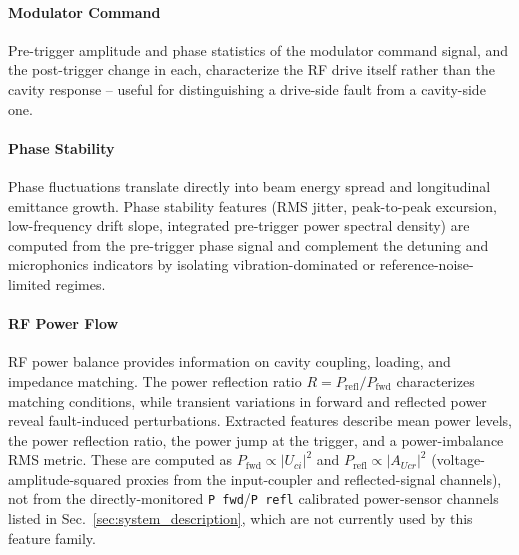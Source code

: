 \paragraph{Modulator Command}

Pre-trigger amplitude and phase statistics of the modulator command signal, and the post-trigger change in each, characterize the RF drive itself rather than the cavity response -- useful for distinguishing a drive-side fault from a cavity-side one.

\paragraph{Phase Stability}

Phase fluctuations translate directly into beam energy spread and longitudinal emittance growth. Phase stability features (RMS jitter, peak-to-peak excursion, low-frequency drift slope, integrated pre-trigger power spectral density) are computed from the pre-trigger phase signal and complement the detuning and microphonics indicators by isolating vibration-dominated or reference-noise-limited regimes.

\paragraph{RF Power Flow}

RF power balance provides information on cavity coupling, loading, and impedance matching. The power reflection ratio $R = P_{\mathrm{refl}}/P_{\mathrm{fwd}}$ %
characterizes matching conditions, while transient variations in forward and reflected power reveal fault-induced perturbations. Extracted features describe mean power levels, the power reflection ratio, the power jump at the trigger, and a power-imbalance RMS metric. These are computed as $P_{\mathrm{fwd}} \propto |U_{ci}|^2$ and $P_{\mathrm{refl}} \propto |A_{Ucr}|^2$ (voltage-amplitude-squared proxies from the input-coupler and reflected-signal channels), not from the directly-monitored \texttt{P fwd}/\texttt{P refl} calibrated power-sensor channels listed in Sec.~\ref{sec:system_description}, which are not currently used by this feature family. %

